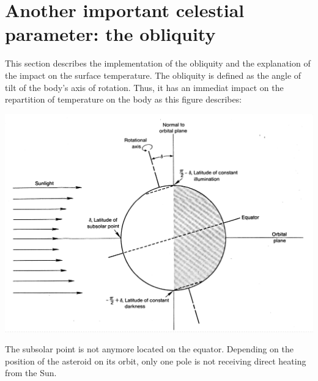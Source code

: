 \section{Another important celestial parameter: the obliquity}
\label{obliquity}

This section describes the implementation of the obliquity and the explanation of the impact on the surface temperature. The obliquity is defined as the angle of tilt of the body's axis of rotation. Thus, it has an immediat impact on the repartition of temperature on the body as this figure describes: 
\begin{center}
    \includegraphics[width=\linewidth]{rsc/obliquity.png}
\end{center}
The subsolar point is not anymore located on the equator. Depending on the position of the asteroid on its orbit, only one pole is not receiving direct heating from the Sun.
